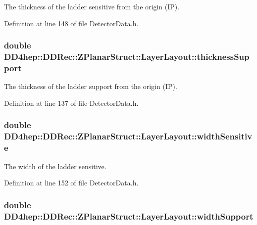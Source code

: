 The thickness of the ladder sensitive from the origin (IP). 

Definition at line 148 of file DetectorData.h.\hypertarget{struct_d_d4hep_1_1_d_d_rec_1_1_z_planar_struct_1_1_layer_layout_ad5631fa2c5ffb8e75433a14045b4db90}{
\subsubsection[{thicknessSupport}]{\setlength{\rightskip}{0pt plus 5cm}double {\bf DD4hep::DDRec::ZPlanarStruct::LayerLayout::thicknessSupport}}}
\label{struct_d_d4hep_1_1_d_d_rec_1_1_z_planar_struct_1_1_layer_layout_ad5631fa2c5ffb8e75433a14045b4db90}


The thickness of the ladder support from the origin (IP). 

Definition at line 137 of file DetectorData.h.\hypertarget{struct_d_d4hep_1_1_d_d_rec_1_1_z_planar_struct_1_1_layer_layout_ab19bdf088e4b8dc7549454825c9592c8}{
\subsubsection[{widthSensitive}]{\setlength{\rightskip}{0pt plus 5cm}double {\bf DD4hep::DDRec::ZPlanarStruct::LayerLayout::widthSensitive}}}
\label{struct_d_d4hep_1_1_d_d_rec_1_1_z_planar_struct_1_1_layer_layout_ab19bdf088e4b8dc7549454825c9592c8}


The width of the ladder sensitive. 

Definition at line 152 of file DetectorData.h.\hypertarget{struct_d_d4hep_1_1_d_d_rec_1_1_z_planar_struct_1_1_layer_layout_a424a9c4bbadfd8837f8f470ae48b2c61}{
\subsubsection[{widthSupport}]{\setlength{\rightskip}{0pt plus 5cm}double {\bf DD4hep::DDRec::ZPlanarStruct::LayerLayout::widthSupport}}}
\label{struct_d_d4hep_1_1_d_d_rec_1_1_z_planar_struct_1_1_layer_layout_a424a9c4bbadfd8837f8f470ae48b2c61}


